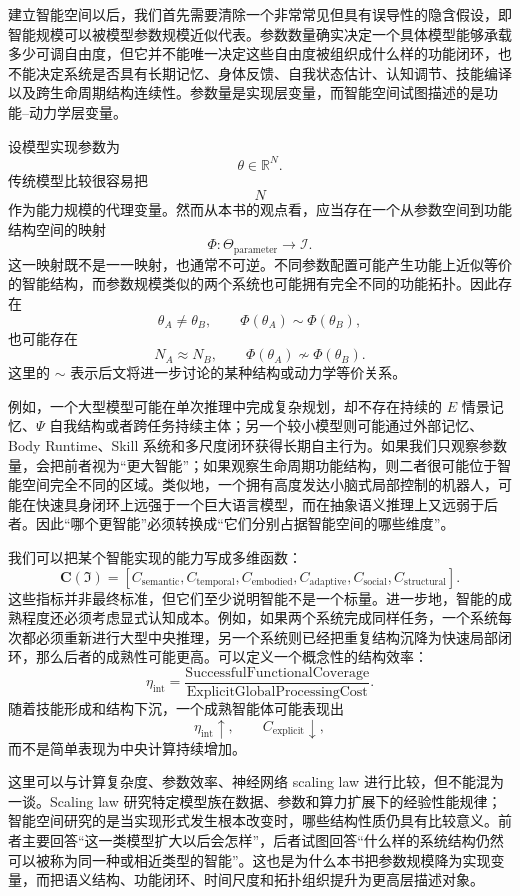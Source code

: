 建立智能空间以后，我们首先需要清除一个非常常见但具有误导性的隐含假设，即智能规模可以被模型参数规模近似代表。参数数量确实决定一个具体模型能够承载多少可调自由度，但它并不能唯一决定这些自由度被组织成什么样的功能闭环，也不能决定系统是否具有长期记忆、身体反馈、自我状态估计、认知调节、技能编译以及跨生命周期结构连续性。参数量是实现层变量，而智能空间试图描述的是功能--动力学层变量。

设模型实现参数为
\[
\theta\in\mathbb R^N.
\]
传统模型比较很容易把
\[
N
\]
作为能力规模的代理变量。然而从本书的观点看，应当存在一个从参数空间到功能结构空间的映射
\[
\Phi:
\Theta_{\mathrm{parameter}}
\longrightarrow
\mathscr I.
\]
这一映射既不是一一映射，也通常不可逆。不同参数配置可能产生功能上近似等价的智能结构，而参数规模类似的两个系统也可能拥有完全不同的功能拓扑。因此存在
\[
\theta_A\neq\theta_B,
\qquad
\Phi(\theta_A)\sim\Phi(\theta_B),
\]
也可能存在
\[
N_A\approx N_B,
\qquad
\Phi(\theta_A)\not\sim\Phi(\theta_B).
\]
这里的 $\sim$ 表示后文将进一步讨论的某种结构或动力学等价关系。

例如，一个大型模型可能在单次推理中完成复杂规划，却不存在持续的 $E$ 情景记忆、$\Psi$ 自我结构或者跨任务持续主体；另一个较小模型则可能通过外部记忆、Body Runtime、Skill 系统和多尺度闭环获得长期自主行为。如果我们只观察参数量，会把前者视为“更大智能”；如果观察生命周期功能结构，则二者很可能位于智能空间完全不同的区域。类似地，一个拥有高度发达小脑式局部控制的机器人，可能在快速具身闭环上远强于一个巨大语言模型，而在抽象语义推理上又远弱于后者。因此“哪个更智能”必须转换成“它们分别占据智能空间的哪些维度”。

我们可以把某个智能实现的能力写成多维函数：
\[
\mathbf C(\mathfrak I)
=
\left[
C_{\mathrm{semantic}},
C_{\mathrm{temporal}},
C_{\mathrm{embodied}},
C_{\mathrm{adaptive}},
C_{\mathrm{social}},
C_{\mathrm{structural}}
\right].
\]
这些指标并非最终标准，但它们至少说明智能不是一个标量。进一步地，智能的成熟程度还必须考虑显式认知成本。例如，如果两个系统完成同样任务，一个系统每次都必须重新进行大型中央推理，另一个系统则已经把重复结构沉降为快速局部闭环，那么后者的成熟性可能更高。可以定义一个概念性的结构效率：
\[
\eta_{\mathrm{int}}
=
\frac{
\mathrm{SuccessfulFunctionalCoverage}
}{
\mathrm{ExplicitGlobalProcessingCost}
}.
\]
随着技能形成和结构下沉，一个成熟智能体可能表现出
\[
\eta_{\mathrm{int}}\uparrow,
\qquad
C_{\mathrm{explicit}}\downarrow,
\]
而不是简单表现为中央计算持续增加。

这里可以与计算复杂度、参数效率、神经网络 scaling law 进行比较，但不能混为一谈。Scaling law 研究特定模型族在数据、参数和算力扩展下的经验性能规律；智能空间研究的是当实现形式发生根本改变时，哪些结构性质仍具有比较意义。前者主要回答“这一类模型扩大以后会怎样”，后者试图回答“什么样的系统结构仍然可以被称为同一种或相近类型的智能”。这也是为什么本书把参数规模降为实现变量，而把语义结构、功能闭环、时间尺度和拓扑组织提升为更高层描述对象。

